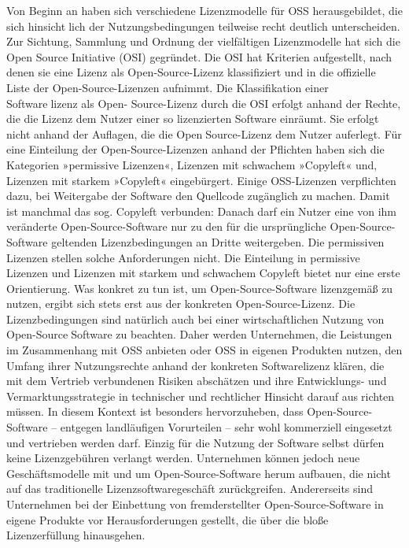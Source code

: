 Von Beginn an haben sich verschiedene Lizenzmodelle für OSS herausgebildet, die sich hinsichtlich der Nutzungsbedingungen teilweise recht deutlich unterscheiden. Zur Sichtung, Sammlung 
und Ordnung der vielfältigen Lizenzmodelle hat sich die Open Source Initiative (OSI) gegründet. 
Die OSI hat Kriterien aufgestellt, nach denen sie eine Lizenz als Open-Source-Lizenz klassifiziert 
und in die offizielle Liste der Open-Source-Lizenzen aufnimmt. Die Klassifikation einer Softwarelizenz als Open- Source-Lizenz durch die OSI erfolgt anhand der Rechte, die die Lizenz dem Nutzer 
einer so lizenzierten Software einräumt. Sie erfolgt nicht anhand der Auflagen, die die OpenSource-Lizenz dem Nutzer auferlegt. 
Für eine Einteilung der Open-Source-Lizenzen anhand der Pflichten haben sich die Kategorien 
»permissive Lizenzen«, Lizenzen mit schwachem »Copyleft« und‚ Lizenzen mit starkem 
»Copyleft« eingebürgert. Einige OSS-Lizenzen verpflichten dazu, bei Weitergabe der Software 
den Quellcode zugänglich zu machen. Damit ist manchmal das sog. Copyleft verbunden: 
Danach darf ein Nutzer eine von ihm veränderte Open-Source-Software nur zu den für die 
ursprüngliche Open-Source-Software geltenden Lizenzbedingungen an Dritte weitergeben. 
Die permissiven Lizenzen stellen solche Anforderungen nicht. Die Einteilung in permissive 
Lizenzen und Lizenzen mit starkem und schwachem Copyleft bietet nur eine erste Orientierung. 
Was konkret zu tun ist, um Open-Source-Software lizenzgemäß zu nutzen, ergibt sich stets erst 
aus der konkreten Open-Source-Lizenz. Die Lizenzbedingungen sind natürlich auch bei einer wirtschaftlichen Nutzung von Open-SourceSoftware zu beachten. Daher werden Unternehmen, die Leistungen im Zusammenhang mit OSS 
anbieten oder OSS in eigenen Produkten nutzen, den Umfang ihrer Nutzungsrechte anhand der 
konkreten Softwarelizenz klären, die mit dem Vertrieb verbundenen Risiken abschätzen und ihre 
Entwicklungs- und Vermarktungsstrategie in technischer und rechtlicher Hinsicht darauf ausrichten müssen. In diesem Kontext ist besonders hervorzuheben, dass Open-Source-Software – 
entgegen landläufigen Vorurteilen – sehr wohl kommerziell eingesetzt und vertrieben werden 
darf. Einzig für die Nutzung der Software selbst dürfen keine Lizenzgebühren verlangt werden. 
Unternehmen können jedoch neue Geschäftsmodelle mit und um Open-Source-Software herum 
aufbauen, die nicht auf das traditionelle Lizenzsoftwaregeschäft zurückgreifen. Andererseits sind Unternehmen bei der Einbettung von fremderstellter Open-Source-Software in 
eigene Produkte vor Herausforderungen gestellt, die über die bloße Lizenzerfüllung hinausgehen. 
